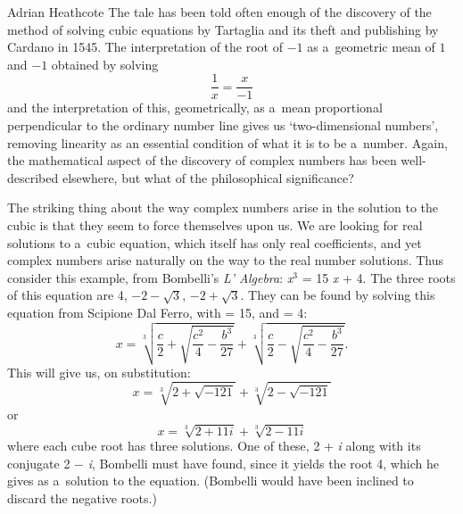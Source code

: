 \begin{artengenv}{Adrian Heathcote}
The tale has been told often enough of the discovery of the method of solving cubic equations by Tartaglia and its theft and publishing by Cardano in 1545. The interpretation of the root of $-1$ as a~geometric mean of $1$ and $-1$ obtained by solving$$\frac{1}{x} = \frac{x}{-1}$$ and the interpretation of this, geometrically, as a~mean proportional perpen\-dicular to the ordinary number line gives us `two-dimensional numbers', removing linearity as an essential condition of what it is to be a~number. Again, the mathematical aspect of the discovery of complex numbers has been well-described elsewhere, but what of the philosophical significance?

The striking thing about the way complex numbers arise in the solution to the cubic is that they seem to force themselves upon us. We are looking for real solutions to a~cubic equation, which itself has only real coefficients, and yet complex numbers arise naturally on the way to the real number solutions. Thus consider this example, from Bombelli's \textit{L' Algebra}: \textit{x}$^{3}$ = 15\textit{ x} + 4.  The three roots of this equation are 4, $-2-\sqrt{3}$, $-2 + \sqrt{3}$. They can be found by solving this equation from Scipione Dal Ferro, with  = 15, and  = 4: $$x = \sqrt[3]{\frac{c}{2} + \sqrt{\frac{c^{2}}{4} - \frac{b^{3}}{27}}} + \sqrt[3]{\frac{c}{2} - \sqrt{\frac{c^{2}}{4} - \frac{b^{3}}{27}}}.$$ This will give us, on substitution: $$x = \sqrt[3]{2 + \sqrt{-121}} + \sqrt[3]{2 - \sqrt{-121}}$$ or $$x = \sqrt[3]{2 + 11i} + \sqrt[3]{2 - 11i} $$ where each cube root has three solutions. One of these, 2 + \textit{i} along with its conjugate 2 $-$ \textit{i}, Bombelli must have found, since it yields the root 4, which he gives as a~solution to the equation. (Bombelli would have been inclined to discard the negative roots.) 


\end{artengenv}
